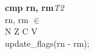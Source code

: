 


\begin{instructionblock}{\imagewidth}%
    \textbf{cmp rn, rm}\hfill\textit{T2}\\
    rn, rm $\in$ \extendedregisters\\
    {N Z C V}\\
    update\_flags(rn - rm);
\end{instructionblock}

